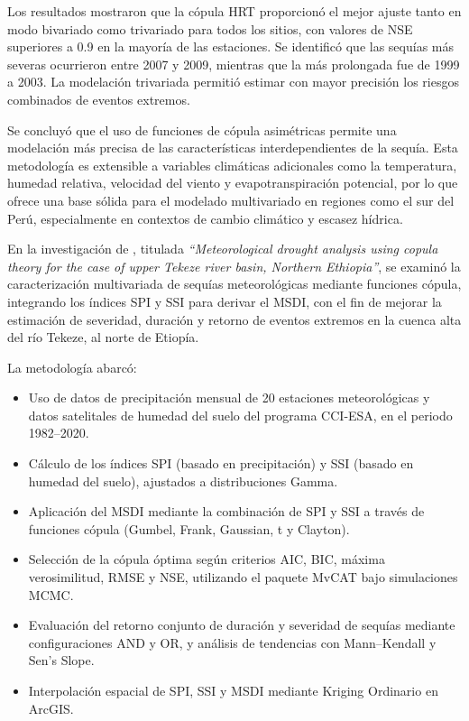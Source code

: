 Los resultados mostraron que la cópula HRT proporcionó el mejor ajuste tanto en modo bivariado como trivariado para todos los sitios, con valores de NSE superiores a 0.9 en la mayoría de las estaciones. Se identificó que las sequías más severas ocurrieron entre 2007 y 2009, mientras que la más prolongada fue de 1999 a 2003. La modelación trivariada permitió estimar con mayor precisión los riesgos combinados de eventos extremos.

Se concluyó que el uso de funciones de cópula asimétricas permite una modelación más precisa de las características interdependientes de la sequía. Esta metodología es extensible a variables climáticas adicionales como la temperatura, humedad relativa, velocidad del viento y evapotranspiración potencial, por lo que ofrece una base sólida para el modelado multivariado en regiones como el sur del Perú, especialmente en contextos de cambio climático y escasez hídrica.


En la investigación de \textcite{Menna2022}, titulada \textit{“Meteorological drought analysis using copula theory for the case of upper Tekeze river basin, Northern Ethiopia”}, se examinó la caracterización multivariada de sequías meteorológicas mediante funciones cópula, integrando los índices SPI y SSI para derivar el MSDI, con el fin de mejorar la estimación de severidad, duración y retorno de eventos extremos en la cuenca alta del río Tekeze, al norte de Etiopía.

La metodología abarcó:
\begin{itemize}
    \item Uso de datos de precipitación mensual de 20 estaciones meteorológicas y datos satelitales de humedad del suelo del programa CCI-ESA, en el periodo 1982–2020.
    \item Cálculo de los índices SPI (basado en precipitación) y SSI (basado en humedad del suelo), ajustados a distribuciones Gamma.
    \item Aplicación del MSDI mediante la combinación de SPI y SSI a través de funciones cópula (Gumbel, Frank, Gaussian, t y Clayton).
    \item Selección de la cópula óptima según criterios AIC, BIC, máxima verosimilitud, RMSE y NSE, utilizando el paquete MvCAT bajo simulaciones MCMC.
    \item Evaluación del retorno conjunto de duración y severidad de sequías mediante configuraciones AND y OR, y análisis de tendencias con Mann–Kendall y Sen’s Slope.
    \item Interpolación espacial de SPI, SSI y MSDI mediante Kriging Ordinario en ArcGIS.
\end{itemize}

